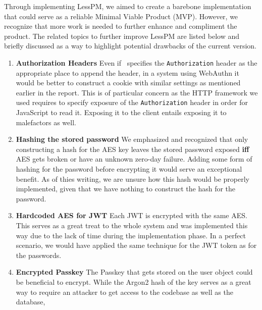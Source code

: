 Through implementing LessPM, we aimed to create a barebone implementation that
could serve as a reliable Minimal Viable Product (MVP).
However, we recognize that more work is needed to further enhance and compliment
the product.
The related topics to further improve LessPM are listed below and briefly
discussed as a way to highlight potential drawbacks of the current version.

    \begin{enumerate}[label=$\blacktriangleright$]
        \item \textbf{Authorization Headers}
        \newline Even if~\cite{RFC7519} specifies the \texttt{Authorization}
        header as the appropriate place to append the header, in a system
        using WebAuthn it would be better to construct a cookie with similar
        settings as mentioned earlier in the report.
        This is of particular concern as the HTTP framework we used requires
        to specify exposure of the \texttt{Authorization} header in order for
        JavaScript to read it.
        Exposing it to the client entails exposing it to malefactors as well.
        \item \textbf{Hashing the stored password}
        \newline We emphasized and recognized that only constructing a hash
        for the AES key leaves the stored password exposed \textbf{iff} AES
        gets broken or have an unknown zero-day failure.
        Adding some form of hashing for the password before encrypting it would
        serve an exceptional benefit.
        As of thies writing, we are unsure how this hash would be properly
        implemented, given that we have nothing to construct the hash for the
        password.
        \item \textbf{Hardcoded AES for JWT}
        \newline Each JWT is encrypted with the same AES\@.
        This serves as a great treat to the whole system and was implemented
        this way due to the lack of time during the implementation phase.
        In a perfect scenario, we would have applied the same technique for
        the JWT token as for the passwords.
        \item \textbf{Encrypted Passkey}
        \newline The Passkey that gets stored on the user object could be
        beneficial
        to encrypt.
        While the Argon2 hash of the key serves as a great way to require an
        attacker to get access to the codebase as well as the database,

\end{enumerate}
